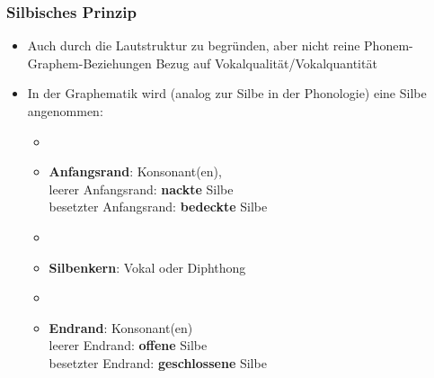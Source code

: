 \begin{frame}
\frametitle{Silbisches Prinzip}

\begin{itemize}
	\item Auch durch die Lautstruktur zu begründen, aber nicht reine Phonem-Graphem-Beziehungen \ras Bezug auf Vokalqualität/Vokalquantität
	\item In der Graphematik wird (analog zur Silbe in der Phonologie) eine Silbe angenommen:
	
	\begin{itemize}
		\item[]
		\item \textbf{Anfangsrand}: Konsonant(en),\\
		leerer Anfangsrand: \textbf{nackte} Silbe\\
		besetzter Anfangsrand: \textbf{bedeckte} Silbe
		\item[]
		\item \textbf{Silbenkern}: Vokal oder Diphthong
		\item[]
		\item \textbf{Endrand}: Konsonant(en)\\
		leerer Endrand: \textbf{offene} Silbe\\
		besetzter Endrand: \textbf{geschlossene} Silbe
	\end{itemize}
\end{itemize}


\end{frame}



